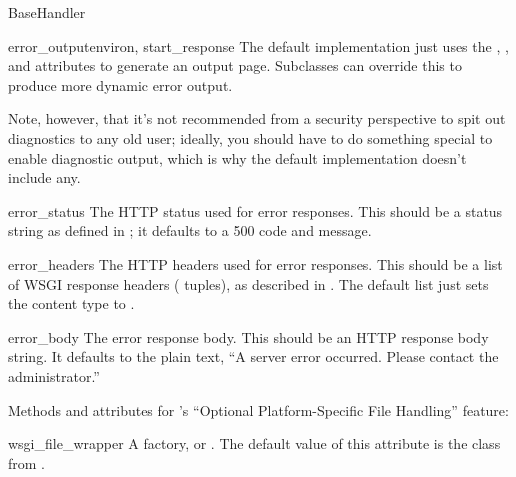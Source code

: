 \begin{classdesc}{BaseHandler}{}
\begin{methoddesc}{error_output}{environ, start_response}
The default implementation just uses the ,
, and  attributes to generate
an output page.  Subclasses can override this to produce more dynamic
error output.

Note, however, that it's not recommended from a security perspective to
spit out diagnostics to any old user; ideally, you should have to do
something special to enable diagnostic output, which is why the default
implementation doesn't include any.
\end{methoddesc}




\begin{memberdesc}{error_status}
The HTTP status used for error responses.  This should be a status
string as defined in ; it defaults to a 500 code and message.
\end{memberdesc}

\begin{memberdesc}{error_headers}
The HTTP headers used for error responses.  This should be a list of
WSGI response headers ( tuples), as
described in .  The default list just sets the content type
to .
\end{memberdesc}

\begin{memberdesc}{error_body}
The error response body.  This should be an HTTP response body string.
It defaults to the plain text, ``A server error occurred.  Please
contact the administrator.''
\end{memberdesc}
























Methods and attributes for 's ``Optional Platform-Specific File
Handling'' feature:

\begin{memberdesc}{wsgi_file_wrapper}
A  factory, or .  The default value
of this attribute is the  class from
.
\end{memberdesc}


\end{classdesc}

